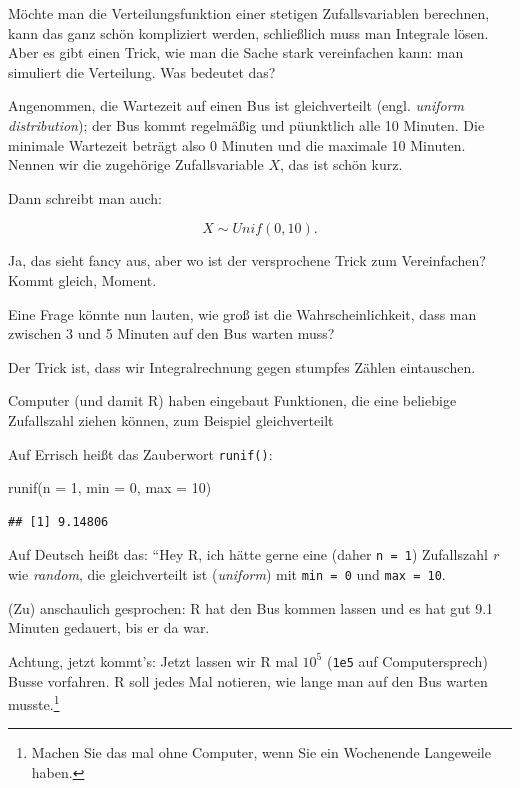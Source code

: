 \documentclass[
  a4paper,
  DIV=11]{scrreprt}
\newenvironment{Shaded}{\begin{snugshade}}{\end{snugshade}}
\newcommand{\AttributeTok}[1]{\textcolor[rgb]{0.40,0.45,0.13}{#1}}
\newcommand{\DecValTok}[1]{\textcolor[rgb]{0.68,0.00,0.00}{#1}}
\newcommand{\FunctionTok}[1]{\textcolor[rgb]{0.28,0.35,0.67}{#1}}
\newcommand{\NormalTok}[1]{\textcolor[rgb]{0.00,0.23,0.31}{#1}}
\theoremstyle{definition}
\theoremstyle{remark}
\begin{document}
Möchte man die Verteilungsfunktion einer stetigen Zufallsvariablen
berechnen, kann das ganz schön kompliziert werden, schließlich muss man
Integrale lösen. Aber es gibt einen Trick, wie man die Sache stark
vereinfachen kann: man simuliert die Verteilung. Was bedeutet das?

Angenommen, die Wartezeit auf einen Bus ist gleichverteilt (engl.
\emph{uniform distribution}); der Bus kommt regelmäßig und püunktlich
alle 10 Minuten. Die minimale Wartezeit beträgt also 0 Minuten und die
maximale 10 Minuten. Nennen wir die zugehörige Zufallsvariable \(X\),
das ist schön kurz.

Dann schreibt man auch:

\[X \sim Unif(0,10).\]

Ja, das sieht fancy aus, aber wo ist der versprochene Trick zum
Vereinfachen? Kommt gleich, Moment.

Eine Frage könnte nun lauten, wie groß ist die Wahrscheinlichkeit, dass
man zwischen 3 und 5 Minuten auf den Bus warten muss?

Der Trick ist, dass wir Integralrechnung gegen stumpfes Zählen
eintauschen.

Computer (und damit R) haben eingebaut Funktionen, die eine beliebige
Zufallszahl ziehen können, zum Beispiel gleichverteilt

Auf Errisch heißt das Zauberwort \texttt{runif()}:

\begin{Shaded}
\begin{Highlighting}[]
\FunctionTok{runif}\NormalTok{(}\AttributeTok{n =} \DecValTok{1}\NormalTok{, }\AttributeTok{min =} \DecValTok{0}\NormalTok{, }\AttributeTok{max =} \DecValTok{10}\NormalTok{)}
\end{Highlighting}
\end{Shaded}

\begin{verbatim}
## [1] 9.14806
\end{verbatim}

Auf Deutsch heißt das: ``Hey R, ich hätte gerne eine (daher
\texttt{n\ =\ 1}) Zufallszahl \emph{r} wie \emph{random}, die
gleichverteilt ist (\emph{uniform}) mit \texttt{min\ =\ 0} und
\texttt{max\ =\ 10}.

(Zu) anschaulich gesprochen: R hat den Bus kommen lassen und es hat gut
9.1 Minuten gedauert, bis er da war.

Achtung, jetzt kommt's: Jetzt lassen wir R mal \(10^5\) (\texttt{1e5}
auf Computersprech) Busse vorfahren. R soll jedes Mal notieren, wie
lange man auf den Bus warten musste.\footnote{Machen Sie das mal ohne
  Computer, wenn Sie ein Wochenende Langeweile haben.}
\end{document}

